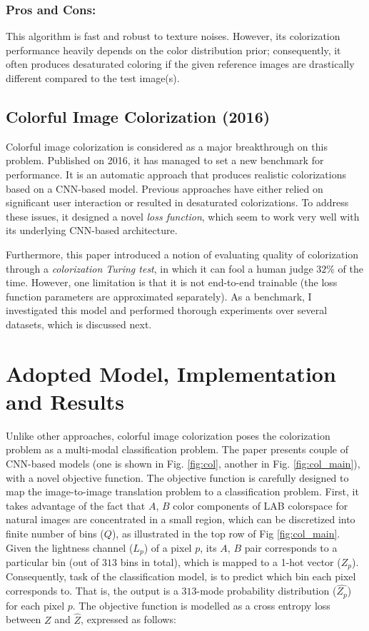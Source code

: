 \documentclass[10pt]{article}
\begin{document}
 

\subsubsection{Pros and Cons:}
This algorithm is fast and robust to texture noises. However, its colorization performance heavily depends on the color distribution prior; consequently, it often produces desaturated coloring if the given reference images are drastically different compared to the test image(s). 

\subsection{\textbf{Colorful Image Colorization (2016)}}
Colorful image colorization \cite{zhang2016colorful} is considered as a major breakthrough on this problem. Published on 2016, it has managed to set a new benchmark for performance. It is an automatic approach that produces realistic colorizations based on a CNN-based model. Previous approaches have either relied on significant user interaction or resulted in desaturated colorizations. To address these issues, it designed a novel \textit{loss function}, which seem to work very well with its underlying CNN-based architecture. 

Furthermore, this paper introduced a notion of evaluating quality of colorization through a \textit{colorization Turing test}, in which it can fool a human judge $32\%$ of the time. However,  one limitation is that it is not end-to-end trainable (the loss function parameters are approximated separately). As a benchmark, I investigated this model and performed thorough experiments over several datasets, which is discussed next.


\section{Adopted Model, Implementation and Results}\label{sec:res}
Unlike other approaches, colorful image colorization \cite{zhang2016colorful} poses the colorization 
problem as a multi-modal classification problem. The paper presents couple of CNN-based models (one is shown in Fig. \ref{fig:col}, another in Fig. \ref{fig:col_main}), with a novel objective function. The objective function is carefully designed to map the image-to-image translation problem to a classification problem. First, it takes advantage of the fact that $A$, $B$ color components of LAB colorspace for natural images are concentrated in a small region, which can be discretized into finite number of bins ($Q$), as illustrated in the top row of Fig \ref{fig:col_main}. 
Given the lightness channel ($L_p$) of a pixel $p$, its $A$, $B$ pair corresponds to a particular bin (out of $313$ bins in total), which is mapped to a 1-hot vector ($Z_p$). 
Consequently, task of the classification model, is to predict which bin each pixel corresponds to. That is, the output is a $313$-mode probability distribution ($ \hat{Z_p}$) for each pixel $p$. The objective function is modelled as a cross entropy loss between $Z$ and $\hat{Z}$, expressed as follows: 
\end{document}
